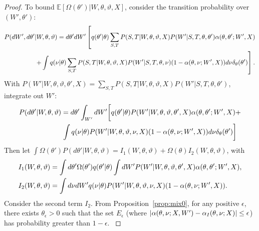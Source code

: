\begin{proof}
To bound $\mathbb{E}\left[\Omega(\theta')  | W, \theta, \vartheta, X\right]$,
consider the transition probability over $(W',\theta')$:
\begin{align*}
  P(dW', d\theta'&| W, \theta, \vartheta)
=d\theta' dW' \left[q(\theta' | \theta)
  \sum_{S,T} P(S, T | W, \theta, \vartheta, X)P(W' | S, T, \theta, \theta')
\alpha(\theta, \theta' ; W', X)\right. \\
&\left.+ \int q(\nu | \theta) \sum_{S,T} P(S, T|W,\theta,\vartheta,
    X)P(W' | S, T, \theta, \nu) ( 1 - {\alpha(\theta, \nu ; W', X)})d\nu
    \delta_\theta(\theta')\right].
\end{align*}
With $P(W' | W, \theta, \vartheta, \theta', X) =
\sum_{S,T} P(S, T | W, \theta, \vartheta, X)P(W' | S, T, \theta, \theta')$,
integrate out $W'$:
\begin{align*}
  P(d\theta'| W, \theta, \vartheta) &=d\theta' \int_{W'}dW'
  \bigg[q(\theta' | \theta)
     P(W' | W, \theta, \vartheta, \theta', X) \alpha(\theta, \theta' ; W', X) + \\
  &\left.  \int q(\ptheta | \theta)  P(W' |  W, \theta, \vartheta, \ptheta,
X) ( 1 - \alpha(\theta, \ptheta ; W', X))d\ptheta
\delta_\theta(\theta')\right] %
\end{align*}
Then let  $\int \Omega(\theta') P(d\theta'| W, \theta, \vartheta)
  = I_1(W, \theta, \vartheta) + \Omega(\theta) I_2(W, \theta, \vartheta) 
$, with
\begin{align*}
  &I_1(W, \theta, \vartheta) = \int d\theta' \Omega(\theta') q(\theta' | \theta)\int dW'P(W' | W, \theta, \vartheta, \theta', X)\alpha(\theta, \theta' ; W', X), \\
&I_2(W, \theta, \vartheta) =\int d\nu  dW'q(\nu | \theta)P(W' | W, \theta, \vartheta, \nu, X)(1 - \alpha(\theta, \nu ; W', X)).
\end{align*}
{Consider the second term $I_2$.
  From Proposition~\ref{prop:mix0}, for any positive $\epsilon$, there
  exists $\theta_\epsilon > 0$ such that the set $E_{\epsilon}$
  (where $|\alpha(\theta, \nu ; X,W') - \alpha_I(\theta, \nu ; X)| \le
  \epsilon$) has probability greater than $1-\epsilon$.
}
\end{proof}
